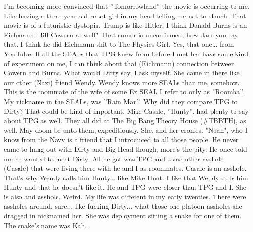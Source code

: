 \documentclass{article}
\begin{document}
\begin{multicols}{2}
I'm becoming more convinced that ''Tomorrowland'' the movie is occurring to me. Like having a three year old robot girl in my head telling me not to slouch. That movie is of a futuristic dystopia. Trump is like Hitler. I think Donald Burns is an Eichmann. Bill Cowern as well? That rumor is unconfirmed, how dare you say that. I think he did Eichmann shit to The Physics Girl. Yes, that one... from YouTube. If all the SEALs that TPG knew from before I met her have some kind of experiment on me, I can think about that (Eichmann) connection between Cowern and Burns. What would Dirty say, I ask myself. She came in there like our other (Nazi) friend Wendy. Wendy knows more SEALs than me, somehow. This is the roommate of the wife of some Ex SEAL I refer to only as ''Roomba''. My nickname in the SEALs, was ''Rain Man''. Why did they compare TPG to Dirty? That could be kind of important. Mike Casale, ''Hunty'', had plenty to say about TPG as well. They all did at The Big Bang Theory House (\#TBBTH), as well. May doom be unto them, expeditiously. She, and her cronies. "Noah", who I know from the Navy is a friend that I introduced to all those people. He never came to hang out with Dirty and Big Head though, more's the pity. He once told me he wanted to meet Dirty. All he got was TPG and some other asshole (Casale) that were living there with he and I as roommates. Casale is an asshole. That's why Wendy calls him Hunty... like Mike Hunt. I like that Wendy calls him Hunty and that he doesn't like it. He and TPG were closer than TPG and I. She is also and asshole. Weird. My life was different in my early twenties. There were assholes around, sure... like fucking Dirty... what those one platoon assholes she dragged in nicknamed her. She was deployment sitting a snake for one of them. The snake's name was Kah.


\end{multicols}
\end{document}
